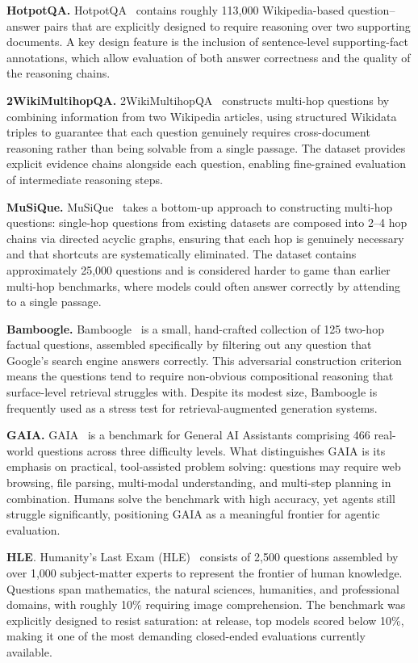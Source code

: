 \documentclass{article}
\begin{document}
\noindent\textbf{HotpotQA.} HotpotQA~\cite{yang2018hotpotqa} contains roughly 113,000 Wikipedia-based question–answer pairs that are explicitly designed to require reasoning over two supporting documents. A key design feature is the inclusion of sentence-level supporting-fact annotations, which allow evaluation of both answer correctness and the quality of the reasoning chains.

\noindent\textbf{2WikiMultihopQA.} 2WikiMultihopQA~\cite{ho2020constructing} constructs multi-hop questions by combining information from two Wikipedia articles, using structured Wikidata triples to guarantee that each question genuinely requires cross-document reasoning rather than being solvable from a single passage. The dataset provides explicit evidence chains alongside each question, enabling fine-grained evaluation of intermediate reasoning steps. 
 
\noindent\textbf{MuSiQue.} MuSiQue~\cite{trivedi2022musique} takes a bottom-up approach to constructing multi-hop questions: single-hop questions from existing datasets are composed into 2–4 hop chains via directed acyclic graphs, ensuring that each hop is genuinely necessary and that shortcuts are systematically eliminated. The dataset contains approximately 25,000 questions and is considered harder to game than earlier multi-hop benchmarks, where models could often answer correctly by attending to a single passage.

\noindent\textbf{Bamboogle.} Bamboogle~\cite{press2023measuring} is a small, hand-crafted collection of 125 two-hop factual questions, assembled specifically by filtering out any question that Google's search engine answers correctly. This adversarial construction criterion means the questions tend to require non-obvious compositional reasoning that surface-level retrieval struggles with. Despite its modest size, Bamboogle is frequently used as a stress test for retrieval-augmented generation systems.

\noindent\textbf{GAIA.} GAIA~\cite{mialon2023gaia} is a benchmark for General AI Assistants comprising 466 real-world questions across three difficulty levels. What distinguishes GAIA is its emphasis on practical, tool-assisted problem solving: questions may require web browsing, file parsing, multi-modal understanding, and multi-step planning in combination. Humans solve the benchmark with high accuracy, yet agents still struggle significantly, positioning GAIA as a meaningful frontier for agentic evaluation.

\noindent\textbf{HLE}. Humanity's Last Exam (HLE)~\cite{phan2025humanity} consists of 2,500 questions assembled by over 1,000 subject-matter experts to represent the frontier of human knowledge. Questions span mathematics, the natural sciences, humanities, and professional domains, with roughly 10\% requiring image comprehension. The benchmark was explicitly designed to resist saturation: at release, top models scored below 10\%, making it one of the most demanding closed-ended evaluations currently available.
\end{document}
